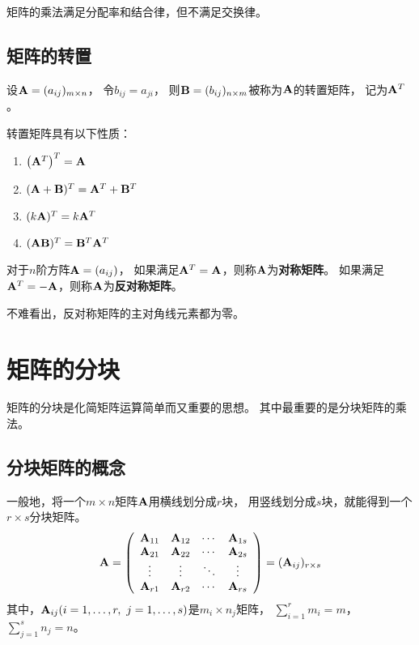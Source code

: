 矩阵的乘法满足分配率和结合律，但不满足交换律。

\subsection{矩阵的转置}
\begin{definition}[矩阵的转置]
    设$\mmA=(a_{ij})_{m\times n}$，
    令$b_{ij}=a_{ji}$，
    则$\mmB=(b_{ij})_{n\times m}$被称为$\mmA$的转置矩阵，
    记为$\mmA^T$。
\end{definition}

\begin{theorem}[转置矩阵的性质]
  转置矩阵具有以下性质：
  \begin{enumerate}
    \item $\left(\mmA^T\right)^T = \mmA$
    \item $(\mmA+\mmB)^T=\mmA^T + \mmB^T$
    \item $(k\mmA)^T=k\mmA^T$
    \item $(\mmA\mmB)^T=\mmB^T\mmA^T$
  \end{enumerate}
\end{theorem}

\begin{definition}[对称矩阵与反对称矩阵]
  对于$n$阶方阵$\mmA=(a_{ij})$，
  如果满足$\mmA^T=\mmA$，则称$\mmA$为\textbf{对称矩阵}。
  如果满足$\mmA^T=-\mmA$，则称$\mmA$为\textbf{反对称矩阵}。
\end{definition}

\begin{remark}
  不难看出，反对称矩阵的主对角线元素都为零。
\end{remark}

\section{矩阵的分块}
矩阵的分块是化简矩阵运算简单而又重要的思想。
其中最重要的是分块矩阵的乘法。

\subsection{分块矩阵的概念}
\begin{definition}[分块矩阵]
  一般地，将一个$m\times n$矩阵$\mmA$用横线划分成$r$块，
  用竖线划分成$s$块，就能得到一个$r\times s$分块矩阵。
  \begin{equation} \label{eq:mat-partition}
  \mmA = \mmat{cccc}{
    \mmA_{11} & \mmA_{12} & \cdots & \mmA_{1s} \\
    \mmA_{21} & \mmA_{22} & \cdots & \mmA_{2s} \\
    \vdots    & \vdots    & \ddots & \vdots    \\
    \mmA_{r1} & \mmA_{r2} & \cdots & \mmA_{rs} }
    = (\mmA_{ij})_{r\times s}
  \end{equation}
  其中，$\mmA_{ij}(i=1,\dots,r,\ j=1,\dots,s)$是$m_i\times n_j$矩阵，
  $\sum_{i=1}^{r}m_i = m$，$\sum_{j=1}^{s}n_j=n$。
\end{definition}

